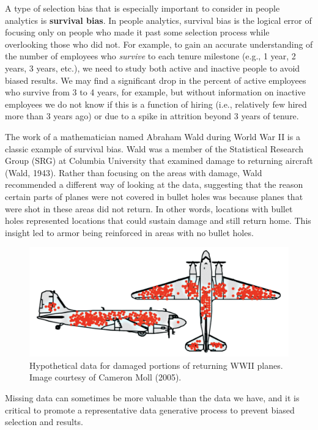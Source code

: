 \documentclass[
]{book}
\begin{document}
A type of selection bias that is especially important to consider in people analytics is \textbf{survival bias}. In people analytics, survival bias is the logical error of focusing only on people who made it past some selection process while overlooking those who did not. For example, to gain an accurate understanding of the number of employees who \emph{survive} to each tenure milestone (e.g., 1 year, 2 years, 3 years, etc.), we need to study both active and inactive people to avoid biased results. We may find a significant drop in the percent of active employees who survive from 3 to 4 years, for example, but without information on inactive employees we do not know if this is a function of hiring (i.e., relatively few hired more than 3 years ago) or due to a spike in attrition beyond 3 years of tenure.

The work of a mathematician named Abraham Wald during World War II is a classic example of survival bias. Wald was a member of the Statistical Research Group (SRG) at Columbia University that examined damage to returning aircraft (Wald, 1943). Rather than focusing on the areas with damage, Wald recommended a different way of looking at the data, suggesting that the reason certain parts of planes were not covered in bullet holes was because planes that were shot in these areas did not return. In other words, locations with bullet holes represented locations that could sustain damage and still return home. This insight led to armor being reinforced in areas with no bullet holes.

\begin{figure}

{\centering \includegraphics[width=0.75\linewidth]{graphics/ww2_plane_damage} 

}

\caption{Hypothetical data for damaged portions of returning WWII planes. Image courtesy of Cameron Moll (2005).}\label{fig:ww2-plane-damage}
\end{figure}

Missing data can sometimes be more valuable than the data we have, and it is critical to promote a representative data generative process to prevent biased selection and results.
\end{document}
